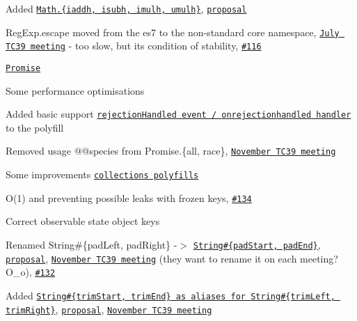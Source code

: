 \begin{DoxyItemize}
\item Added \href{https://github.com/zloirock/core-js#ecmascript-7-proposals}{\tt {\ttfamily Math.\{iaddh, isubh, imulh, umulh\}}}, \href{https://gist.github.com/BrendanEich/4294d5c212a6d2254703}{\tt proposal}
\item {\ttfamily Reg\+Exp.\+escape} moved from the {\ttfamily es7} to the non-\/standard {\ttfamily core} namespace, \href{https://github.com/rwaldron/tc39-notes/blob/master/es7/2015-07/july-28.md#62-regexpescape}{\tt July T\+C39 meeting} -\/ too slow, but it\textquotesingle{}s condition of stability, \href{https://github.com/zloirock/core-js/issues/116}{\tt \#116}
\item \href{https://github.com/zloirock/core-js#ecmascript-6-promise}{\tt {\ttfamily Promise}}
\begin{DoxyItemize}
\item Some performance optimisations
\item Added basic support \href{https://github.com/zloirock/core-js#unhandled-rejection-tracking}{\tt {\ttfamily rejection\+Handled} event / {\ttfamily onrejectionhandled} handler} to the polyfill
\item Removed usage {\ttfamily @@species} from {\ttfamily Promise.\{all, race\}}, \href{https://github.com/rwaldron/tc39-notes/tree/master/es7/2015-11/nov-18.md#conclusionresolution-2}{\tt November T\+C39 meeting}
\end{DoxyItemize}
\item Some improvements \href{https://github.com/zloirock/core-js#ecmascript-6-collections}{\tt collections polyfills}
\begin{DoxyItemize}
\item {\ttfamily O(1)} and preventing possible leaks with frozen keys, \href{https://github.com/zloirock/core-js/issues/134}{\tt \#134}
\item Correct observable state object keys
\end{DoxyItemize}
\item Renamed {\ttfamily String\#\{pad\+Left, pad\+Right\}} -\/$>$ \href{https://github.com/zloirock/core-js#ecmascript-7-proposals}{\tt {\ttfamily String\#\{pad\+Start, pad\+End\}}}, \href{https://github.com/tc39/proposal-string-pad-start-end}{\tt proposal}, \href{https://github.com/rwaldron/tc39-notes/tree/master/es7/2015-11/nov-17.md#conclusionresolution-2}{\tt November T\+C39 meeting} (they want to rename it on each meeting?O\+\_\+o), \href{https://github.com/zloirock/core-js/issues/132}{\tt \#132}
\item Added \href{https://github.com/zloirock/core-js#ecmascript-7-proposals}{\tt {\ttfamily String\#\{trim\+Start, trim\+End\}} as aliases for {\ttfamily String\#\{trim\+Left, trim\+Right\}}}, \href{https://github.com/sebmarkbage/ecmascript-string-left-right-trim}{\tt proposal}, \href{https://github.com/rwaldron/tc39-notes/tree/master/es7/2015-11/nov-17.md#conclusionresolution-2}{\tt November T\+C39 meeting}

\end{DoxyItemize}
